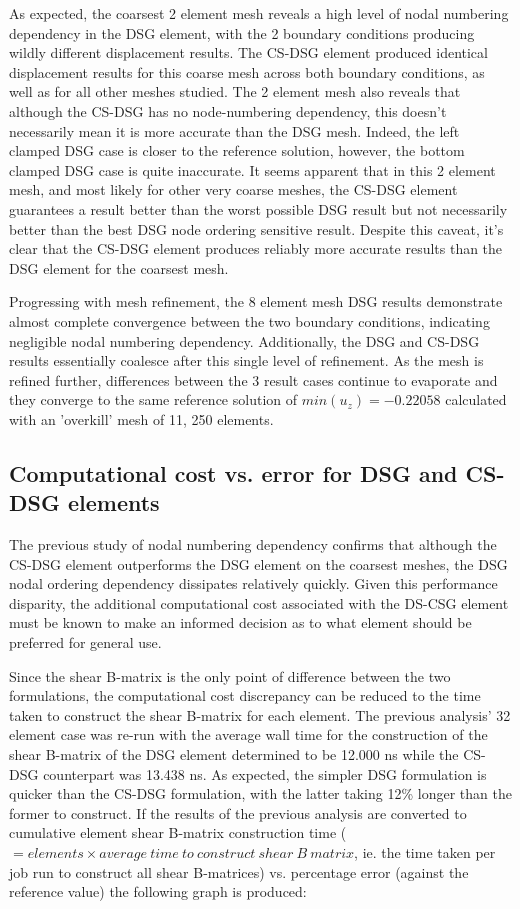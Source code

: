 As expected, the coarsest 2 element mesh reveals a high level of nodal numbering dependency in the DSG element, with the 2 boundary conditions producing wildly different displacement results. The CS-DSG element produced identical displacement results for this coarse mesh across both boundary conditions, as well as for all other meshes studied. The 2 element mesh also reveals that although the CS-DSG has no node-numbering dependency, this doesn't necessarily mean it is more accurate than the DSG mesh. Indeed, the left clamped DSG case is closer to the reference solution, however, the bottom clamped DSG case is quite inaccurate. It seems apparent that in this 2 element mesh, and most likely for other very coarse meshes, the CS-DSG element guarantees a result better than the worst possible DSG result but not necessarily better than the best DSG node ordering sensitive result. Despite this caveat, it's clear that the CS-DSG element produces reliably more accurate results than the DSG element for the coarsest mesh.

Progressing with mesh refinement, the 8 element mesh DSG results demonstrate almost complete convergence between the two boundary conditions, indicating negligible nodal numbering dependency. Additionally, the DSG and CS-DSG results essentially coalesce after this single level of refinement. As the mesh is refined further, differences between the 3 result cases continue to evaporate and they converge to the same reference solution of $min(u_z) = -0.22058$ calculated with an 'overkill' mesh of 11, 250 elements.

\subsection{Computational cost vs. error for DSG and CS-DSG elements}
The previous study of nodal numbering dependency confirms that although the CS-DSG element outperforms the DSG element on the coarsest meshes, the DSG nodal ordering dependency dissipates relatively quickly. Given this performance disparity, the additional computational cost associated with the DS-CSG element must be known to make an informed decision as to what element should be preferred for general use. 

Since the shear B-matrix is the only point of difference between the two formulations, the computational cost discrepancy can be reduced to the time taken to construct the shear B-matrix for each element. The previous analysis' 32 element case was re-run with the average wall time for the construction of the shear B-matrix of the DSG element determined to be 12.000 ns while the CS-DSG counterpart was 13.438 ns. As expected, the simpler DSG formulation is quicker than the CS-DSG formulation, with the latter taking 12\% longer than the former to construct. If the results of the previous analysis are converted to cumulative element shear B-matrix construction time ($= elements \times average\ time\ to\ construct\ shear\ B\ matrix$, ie. the time taken per job run to construct all shear B-matrices) vs. percentage error (against the reference value) the following graph is produced:

